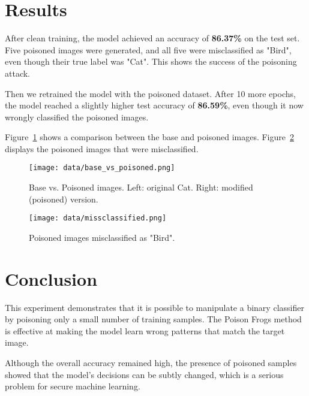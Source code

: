 \documentclass{article}
\begin{document}
\section{Results}
After clean training, the model achieved an accuracy of \textbf{86.37\%} on the test set. Five poisoned images were generated, and all five were misclassified as "Bird", even though their true label was "Cat". This shows the success of the poisoning attack.

Then we retrained the model with the poisoned dataset. After 10 more epochs, the model reached a slightly higher test accuracy of \textbf{86.59\%}, even though it now wrongly classified the poisoned images.

Figure~\ref{fig:poisoned} shows a comparison between the base and poisoned images. Figure~\ref{fig:misclassified} displays the poisoned images that were misclassified.

\begin{figure}[h]
    \centering
    \texttt{[image: data/base\_vs\_poisoned.png]}
    \caption{Base vs. Poisoned images. Left: original Cat. Right: modified (poisoned) version.}
    \label{fig:poisoned}
\end{figure}

\begin{figure}[h]
    \centering
    \texttt{[image: data/missclassified.png]}
    \caption{Poisoned images misclassified as "Bird".}
    \label{fig:misclassified}
\end{figure}

\section{Conclusion}
This experiment demonstrates that it is possible to manipulate a binary classifier by poisoning only a small number of training samples. The Poison Frogs method is effective at making the model learn wrong patterns that match the target image.

Although the overall accuracy remained high, the presence of poisoned samples showed that the model's decisions can be subtly changed, which is a serious problem for secure machine learning.
\end{document}
